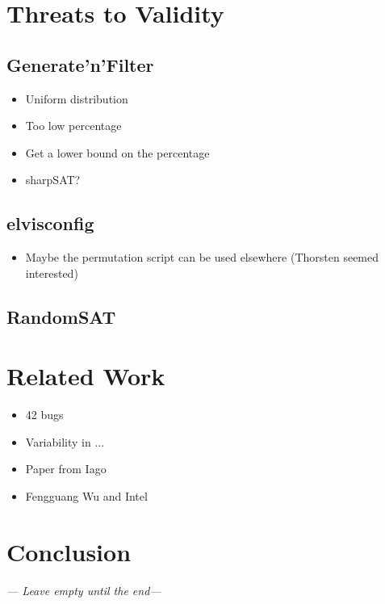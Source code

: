 \documentclass[a4paper,11pt]{article}
\begin{document}
\newpage
\section{Threats to Validity}

\subsection{Generate'n'Filter}

\begin{itemize}
    \item Uniform distribution
    \item Too low percentage
    \item Get a lower bound on the percentage
    \item sharpSAT?
\end{itemize}

\subsection{elvisconfig}

\begin{itemize}
    \item Maybe the permutation script can be used elsewhere (Thorsten seemed 
        interested)
\end{itemize}

\subsection{RandomSAT}





\newpage
\section{Related Work}

\begin{itemize}
    \item 42 bugs
    \item Variability in ...
    \item Paper from Iago
    \item Fengguang Wu and Intel
\end{itemize}



\newpage
\section{Conclusion}
\emph{--- Leave empty until the end---}




\newpage

\end{document}
